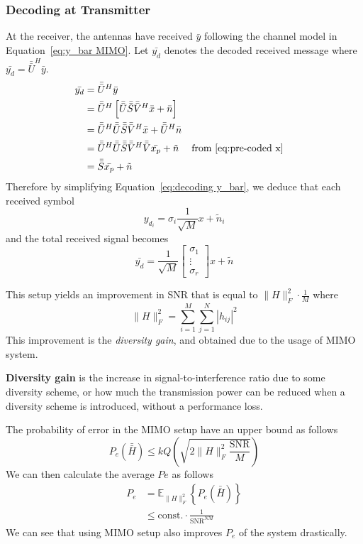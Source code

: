 \subsubsection{Decoding at Transmitter}
At the receiver, the antennas have received $\bar{y}$ following the channel model in Equation~\ref{eq:y_bar MIMO}. Let $\bar{y_d}$ denotes the decoded received message where $\bar{y_d} = \bar{\bar{U}}^H \bar{y}$.
\begin{equation}
    \label{eq:decoding y_bar}
    \begin{aligned}
        \bar{y_d} &= \bar{\bar{U}}^H \bar{y} \\
        &= \bar{\bar{U}}^H \left[ \bar{\bar{U}} \bar{\bar{S}} \bar{\bar{V}}^H \bar{x} + \bar{n} \right] \\
        &= \bar{\bar{U}}^H \bar{\bar{U}} \bar{\bar{S}} \bar{\bar{V}}^H \bar{x} + \bar{\bar{U}}^H \bar{n} \\
        &= \bar{\bar{U}}^H \bar{\bar{U}} \bar{\bar{S}} \bar{\bar{V}}^H \bar{\bar{V}} \bar{x_p} + \tilde{n} && \text{from \ref{eq:pre-coded x}} \\
        &= \bar{\bar{S}} \bar{x_p} + \tilde{n}
    \end{aligned}
\end{equation}
Therefore by simplifying Equation~\ref{eq:decoding y_bar}, we deduce that each received symbol
\[ y_{d_i} = \sigma_i \frac{1}{\sqrt{M}} x + \tilde{n}_i \]
and the total received signal becomes
\begin{equation}
    \label{eq:y for mimo div}
    \bar{y_d} =  \frac{1}{\sqrt{M}} \left[ \begin{array}{c}
        \sigma_1 \\
        \vdots \\
        \sigma_r
    \end{array} \right] x + \tilde{n}
\end{equation}

This setup yields an improvement in SNR that is equal to $\|H\|_F^2 \cdot \frac{1}{M}$ where
\[\|H\|_F^2 = \sum_{i=1}^{M} \sum_{j=1}^{N} |h_{ij}|^2\]
This improvement is the \emph{diversity gain}, and obtained due to the usage of MIMO system.  
\begin{GrayBox}
    \textbf{Diversity gain} is the increase in signal-to-interference ratio due to some diversity scheme, or how much the transmission power can be reduced when a diversity scheme is introduced, without a performance loss.
\end{GrayBox}

The probability of error in the MIMO setup have an upper bound as follows
\[ P_e \left( \bar{\bar{H}} \right) \leq k Q\left( \sqrt{ 2 \|H\|_F^2 \frac{\text{SNR}}{M} } \right) \] 
We can then calculate the average $Pe$ as follows
\begin{equation}
    \label{eq:avg Pe mimo}
    \begin{aligned}
        P_e &= \mathbb{E}_{\|H\|_F^2} \left\{ P_e \left( \bar{\bar{H}} \right) \right\} \\
        & \leq \text{const.} \cdot \frac{1}{\text{SNR}^{NM}}
    \end{aligned}
\end{equation}
We can see that using MIMO setup also improves $P_e$ of the system drastically.

